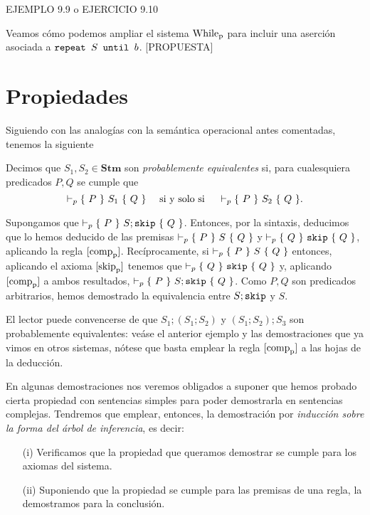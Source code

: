 \begin{example}
EJEMPLO 9.9 o EJERCICIO 9.10
\end{example}

\begin{example}
Veamos cómo podemos ampliar el sistema $\nn{While}_\nn{p}$ para incluir una aserción asociada a $\n{repeat }S\n{ until }b$. [PROPUESTA]
\begin{prooftree}
\end{prooftree}
\end{example}

\section{Propiedades}

Siguiendo con las analogías con la semántica operacional antes comentadas, tenemos la siguiente
\begin{definition}
Decimos que $S_1, S_2 \in \mathbf{Stm}$ son \textit{probablemente equivalentes} si, para cualesquiera predicados $P, Q$ se cumple que
$$\vdash_p \pre{P}{S_1}{Q} \quad \text{ si y solo si } \quad \vdash_p \pre{P}{S_2}{Q}.$$
\end{definition}


\begin{example}
Supongamos que $\vdash_p \pre{P}{S;\n{skip}}{Q}$. Entonces, por la sintaxis, deducimos que lo hemos deducido de las premisas $\vdash_p \pre{P}{S}{Q}$ y $\vdash_p \pre{Q}{\n{skip}}{Q}$, aplicando la regla $[\text{comp}_{\nn{p}}]$. Recíprocamente, si $\vdash_p \pre{P}{S}{Q}$ entonces, aplicando el axioma $[\text{skip}_{\nn{p}}]$ tenemos que $\vdash_p \pre{Q}{\n{skip}}{Q}$ y, aplicando $[\text{comp}_{\nn{p}}]$ a ambos resultados, $\vdash_p \pre{P}{S;\n{skip}}{Q}$. Como $P, Q$ son predicados arbitrarios, hemos demostrado la equivalencia entre $S;\n{skip}$ y $S$.
\end{example}

\begin{example}
El lector puede convencerse de que $S_1;(S_1;S_2)$ y $(S_1;S_2);S_3$ son probablemente equivalentes: veáse el anterior ejemplo y las demostraciones que ya vimos en otros sistemas, nótese que basta emplear la regla $[\text{comp}_{\nn{p}}]$ a las hojas de la deducción.
\end{example}

En algunas demostraciones nos veremos obligados a suponer que hemos probado cierta propiedad con sentencias simples para poder demostrarla en sentencias complejas. Tendremos que emplear, entonces, la demostración por \textit{inducción sobre la forma del árbol de inferencia}, es decir:
\begin{itemize}
    \item[(i)] Verificamos que la propiedad que queramos demostrar se cumple para los axiomas del sistema.
    \item[(ii)] Suponiendo que la propiedad se cumple para las premisas de una regla, la demostramos para la conclusión.
\end{itemize}

